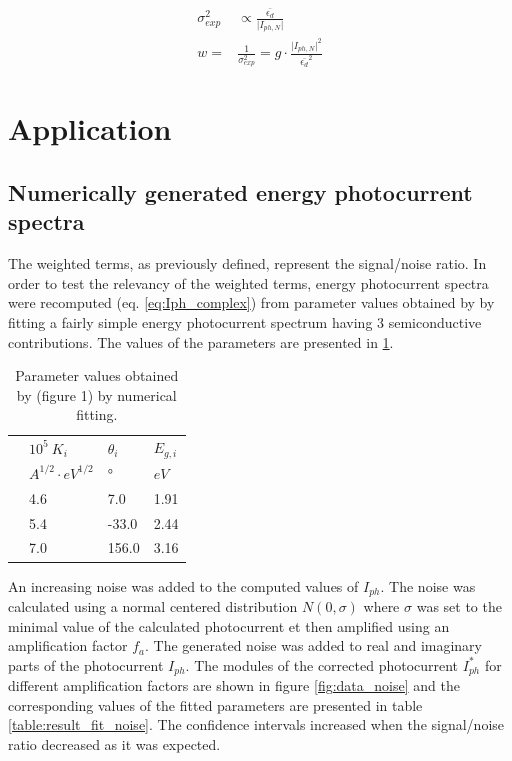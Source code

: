 \documentclass[10pt, 3p, sort&compress]{elsarticle}
\newcommand{\sigmae}{\sigma _{exp}}
\begin{document}
\begin{equation}
\begin{split}
\sigmae ^2 & \propto \frac{\bar{\epsilon _d}}{\vert I_{ph,N} \vert} \\
w = & \frac{1}{\sigmae ^2} = g \cdot \frac{\vert I_{ph,N} \vert ^2}{\bar{\epsilon _d} ^2}
\end{split}
\label{eq:w_epsd}
\end{equation}


\section{Application}
\subsection{Numerically generated energy photocurrent spectra}

The weighted terms, as previously defined, represent the signal/noise ratio. In order to test the relevancy of the weighted terms, energy photocurrent spectra were recomputed (eq. \ref{eq:Iph_complex}) from parameter values obtained by \citet{petit2013} by fitting a fairly simple energy photocurrent spectrum having 3 semiconductive contributions. The values of the parameters are presented in \ref{table:3m_params}.

\begin{table}[htpb]
\begin{tabular}{ p{1cm}|p{2cm}|p{2cm}| p{2cm}}
\toprule
 & $10^5 \ K_i$ & $\theta _i$ &  $E_{g,i}$\\
 & $A^{1/2} \cdot eV^{1/2}$ & ° & $eV$\\
\midrule
& 4.6    & 7.0 &   1.91\\
&   5.4  & -33.0 & 2.44\\
& 7.0 & 156.0 &  3.16\\
 \bottomrule
\end{tabular}
\caption{Parameter values obtained by \citet{petit2013} (figure 1) by numerical fitting.}
\label{table:3m_params}
\end{table}
 
 An increasing noise was added to the computed values of $I_{ph}$. The noise was calculated using a normal centered distribution $N(0,\sigma)$ where $\sigma$ was set to the minimal value of the calculated photocurrent et then amplified using an amplification factor $f_a$. The generated noise was added to real and imaginary parts of the photocurrent $I_{ph}$. The modules of the corrected photocurrent $I_{ph}^*$ for different amplification factors are shown in figure \ref{fig:data_noise} and the corresponding values of the fitted parameters are presented in table \ref{table:result_fit_noise}. The confidence intervals increased when the signal/noise ratio decreased as it was expected.
 
\end{document}

